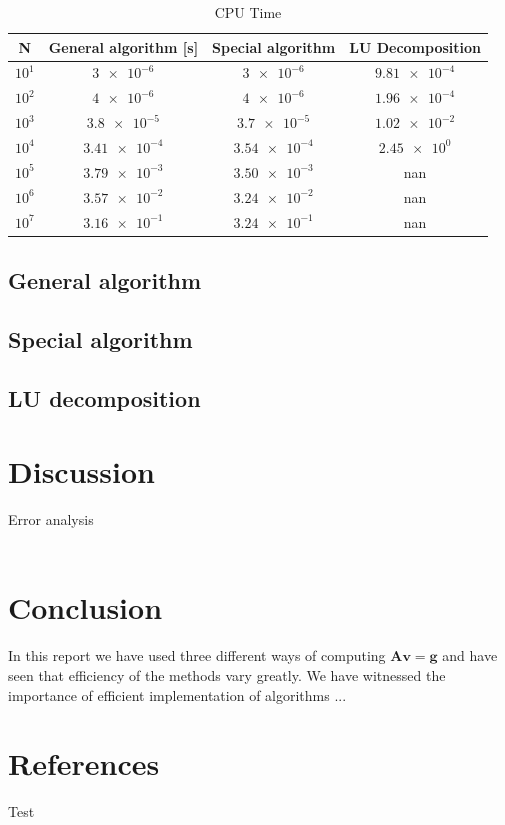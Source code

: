 \documentclass[american,a4paper,12pt]{article}
\renewcommand{\vec}[1]{\mathbf{#1}} %
\begin{document}
  \begin{table}[H]
    \begin{center}
    \caption{CPU Time}
    \begin{tabular}{|c|c|c|c|} \hline
    \textbf{N} & \textbf{General algorithm [s]} & \textbf{Special algorithm} & \textbf{LU Decomposition} \\ \hline
    $10^1$ & $\num{3e-6}$     & $\num{3e-6}$    & $\num{9.81e-4}$ \\ \hline
    $10^2$ & $\num{4e-6}$     & $\num{4e-6}$    & $\num{1.96e-4}$ \\ \hline
    $10^3$ & $\num{3.8e-5}$   & $\num{3.7e-5}$  & $\num{1.02e-2}$ \\ \hline
    $10^4$ & $\num{3.41e-4}$  & $\num{3.54e-4}$ & $\num{2.45e0}$ \\ \hline
    $10^5$ & $\num{3.79e-3}$  & $\num{3.50e-3}$ & nan \\ \hline
    $10^6$ & $\num{3.57e-2}$  & $\num{3.24e-2}$ & nan \\ \hline
    $10^7$ & $\num{3.16e-1}$  & $\num{3.24e-1}$ & nan \\ \hline
    \end{tabular}
    \end{center}
    \label{tab:final_res}
  \end{table}

\subsection{General algorithm}

\subsection{Special algorithm}

\subsection{LU decomposition}

\section{Discussion}
Error analysis \\
\\


\section{Conclusion}
In this report we have used three different ways of computing $\vec{A}\vec{v} = \vec{g}$ and have seen that efficiency of the methods vary greatly. We have witnessed the importance of efficient implementation of algorithms ...


\section{References} %

\begin{thebibliography}{9}
 Test



\end{thebibliography}
\end{document}
